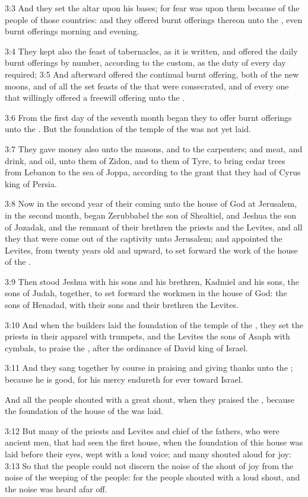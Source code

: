 3:3 And they set the altar upon his bases; for fear was upon them
because of the people of those countries: and they offered burnt
offerings thereon unto the \LORD, even burnt offerings morning and
evening.

3:4 They kept also the feast of tabernacles, as it is written, and
offered the daily burnt offerings by number, according to the custom,
as the duty of every day required; 3:5 And afterward offered the
continual burnt offering, both of the new moons, and of all the set
feasts of the \LORD that were consecrated, and of every one that
willingly offered a freewill offering unto the \LORD.

3:6 From the first day of the seventh month began they to offer burnt
offerings unto the \LORD. But the foundation of the temple of the \LORD
was not yet laid.

3:7 They gave money also unto the masons, and to the carpenters; and
meat, and drink, and oil, unto them of Zidon, and to them of Tyre, to
bring cedar trees from Lebanon to the sea of Joppa, according to the
grant that they had of Cyrus king of Persia.

3:8 Now in the second year of their coming unto the house of God at
Jerusalem, in the second month, began Zerubbabel the son of Shealtiel,
and Jeshua the son of Jozadak, and the remnant of their brethren the
priests and the Levites, and all they that were come out of the
captivity unto Jerusalem; and appointed the Levites, from twenty years
old and upward, to set forward the work of the house of the \LORD.

3:9 Then stood Jeshua with his sons and his brethren, Kadmiel and his
sons, the sons of Judah, together, to set forward the workmen in the
house of God: the sons of Henadad, with their sons and their brethren
the Levites.

3:10 And when the builders laid the foundation of the temple of the
\LORD, they set the priests in their apparel with trumpets, and the
Levites the sons of Asaph with cymbals, to praise the \LORD, after the
ordinance of David king of Israel.

3:11 And they sang together by course in praising and giving thanks
unto the \LORD; because he is good, for his mercy endureth for ever
toward Israel.

And all the people shouted with a great shout, when they praised the
\LORD, because the foundation of the house of the \LORD was laid.

3:12 But many of the priests and Levites and chief of the fathers, who
were ancient men, that had seen the first house, when the foundation
of this house was laid before their eyes, wept with a loud voice; and
many shouted aloud for joy: 3:13 So that the people could not discern
the noise of the shout of joy from the noise of the weeping of the
people: for the people shouted with a loud shout, and the noise was
heard afar off.

